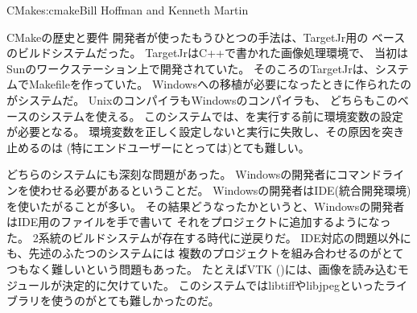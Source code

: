 \begin{aosachapter}{CMake}{s:cmake}{Bill Hoffman and Kenneth Martin}
\begin{aosasect1}{CMakeの歴史と要件}
開発者が使ったもうひとつの手法は、TargetJr用の
ベースのビルドシステムだった。
TargetJrはC++で書かれた画像処理環境で、
当初はSunのワークステーション上で開発されていた。
そのころのTargetJrは、システムでMakefileを作っていた。
Windowsへの移植が必要になったときに作られたのがシステムだ。
UnixのコンパイラもWindowsのコンパイラも、
どちらもこのベースのシステムを使える。
このシステムでは、を実行する前に環境変数の設定が必要となる。
環境変数を正しく設定しないと実行に失敗し、その原因を突き止めるのは
(特にエンドユーザーにとっては)とても難しい。

どちらのシステムにも深刻な問題があった。
Windowsの開発者にコマンドラインを使わせる必要があるということだ。
Windowsの開発者はIDE(統合開発環境)を使いたがることが多い。
その結果どうなったかというと、Windowsの開発者はIDE用のファイルを手で書いて
それをプロジェクトに追加するようになった。
2系統のビルドシステムが存在する時代に逆戻りだ。
IDE対応の問題以外にも、先述のふたつのシステムには
複数のプロジェクトを組み合わせるのがとてつもなく難しいという問題もあった。
たとえばVTK ()には、画像を読み込むモジュールが決定的に欠けていた。
このシステムではlibtiffやlibjpegといったライブラリを使うのがとても難しかったのだ。


\end{aosasect1}
\end{aosachapter}
